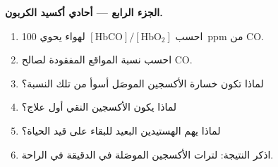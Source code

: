 \begin{problem}
\medskip\noindent\textbf{الجزء الرابع --- أحادي أكسيد الكربون.}
\begin{enumerate}[resume]
  \item احسب $[\mathrm{HbCO}]/[\mathrm{HbO_2}]$ لهواء يحوي \qty{100}{ppm} من CO.
  \item احسب نسبة المواقع المفقودة لصالح CO.
  \item لماذا تكون خسارة الأكسجين الموصَل أسوأ من تلك النسبة؟
  \item لماذا يكون الأكسجين النقي أول علاج؟
  \item لماذا يهم الهستيدين البعيد للبقاء على قيد الحياة؟
  \item اذكر النتيجة: لترات الأكسجين الموصَلة في الدقيقة في الراحة.
\end{enumerate}
\end{problem}

